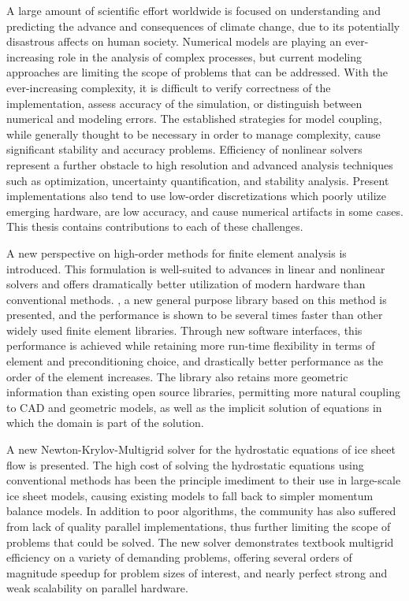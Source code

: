 A large amount of scientific effort worldwide is focused on understanding and predicting the advance and consequences of climate change, due to its potentially disastrous affects on human society.
Numerical models are playing an ever-increasing role in the analysis of complex processes, but current modeling approaches are limiting the scope of problems that can be addressed.
With the ever-increasing complexity, it is difficult to verify correctness of the implementation, assess accuracy of the simulation, or distinguish between numerical and modeling errors.
The established strategies for model coupling, while generally thought to be necessary in order to manage complexity, cause significant stability and accuracy problems.
Efficiency of nonlinear solvers represent a further obstacle to high resolution and advanced analysis techniques such as optimization, uncertainty quantification, and stability analysis.
Present implementations also tend to use low-order discretizations which poorly utilize emerging hardware, are low accuracy, and cause numerical artifacts in some cases.
This thesis contains contributions to each of these challenges.

A new perspective on high-order methods for finite element analysis is introduced.
This formulation is well-suited to advances in linear and nonlinear solvers and offers dramatically better utilization of modern hardware than conventional methods.
\Dohp, a new general purpose library based on this method is presented, and the performance is shown to be several times faster than other widely used finite element libraries.
Through new software interfaces, this performance is achieved while retaining more run-time flexibility in terms of element and preconditioning choice, and drastically better performance as the order of the element increases.
The library also retains more geometric information than existing open source libraries, permitting more natural coupling to CAD and geometric models, as well as the implicit solution of equations in which the domain is part of the solution.

A new Newton-Krylov-Multigrid solver for the hydrostatic equations of ice sheet flow is presented.
The high cost of solving the hydrostatic equations using conventional methods has been the principle imediment to their use in large-scale ice sheet models, causing existing models to fall back to simpler momentum balance models.
In addition to poor algorithms, the community has also suffered from lack of quality parallel implementations, thus further limiting the scope of problems that could be solved.
The new solver demonstrates textbook multigrid efficiency on a variety of demanding problems, offering several orders of magnitude speedup for problem sizes of interest, and nearly perfect strong and weak scalability on parallel hardware.

